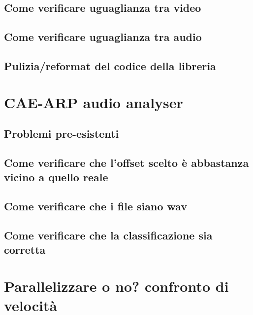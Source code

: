 \subsection{Come verificare uguaglianza tra video}  %
\subsection{Come verificare uguaglianza tra audio}  %
\subsection{Pulizia/reformat del codice della libreria} %
\section{\acs{CAE}-\acs{ARP} audio analyser}
\subsection{Problemi pre-esistenti} %
\subsection{Come verificare che l'offset scelto è abbastanza vicino a quello reale} %
\subsection{Come verificare che i file siano wav}   %
\subsection{Come verificare che la classificazione sia corretta}    %
\section{Parallelizzare o no? confronto di velocità} \label{sec:parallelizzazione}
